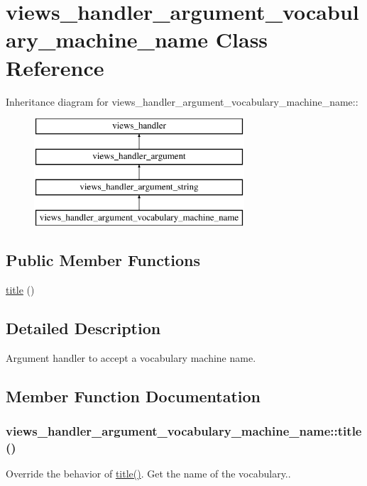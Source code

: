 \hypertarget{classviews__handler__argument__vocabulary__machine__name}{
\section{views\_\-handler\_\-argument\_\-vocabulary\_\-machine\_\-name Class Reference}
\label{classviews__handler__argument__vocabulary__machine__name}
}
Inheritance diagram for views\_\-handler\_\-argument\_\-vocabulary\_\-machine\_\-name::\begin{figure}[H]
\begin{center}
\leavevmode
\includegraphics[height=4cm]{classviews__handler__argument__vocabulary__machine__name}
\end{center}
\end{figure}
\subsection*{Public Member Functions}
\begin{DoxyCompactItemize}
\item 
\hyperlink{classviews__handler__argument__vocabulary__machine__name_a97cd30f6f945568766976bc99f4812ae}{title} ()
\end{DoxyCompactItemize}


\subsection{Detailed Description}
Argument handler to accept a vocabulary machine name. 

\subsection{Member Function Documentation}
\hypertarget{classviews__handler__argument__vocabulary__machine__name_a97cd30f6f945568766976bc99f4812ae}{
\subsubsection[{title}]{\setlength{\rightskip}{0pt plus 5cm}views\_\-handler\_\-argument\_\-vocabulary\_\-machine\_\-name::title ()}}
\label{classviews__handler__argument__vocabulary__machine__name_a97cd30f6f945568766976bc99f4812ae}
Override the behavior of \hyperlink{classviews__handler__argument__vocabulary__machine__name_a97cd30f6f945568766976bc99f4812ae}{title()}. Get the name of the vocabulary.. 

